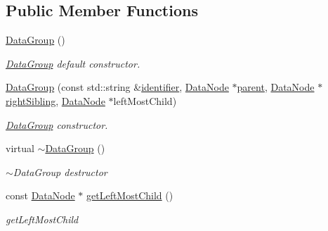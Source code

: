 \subsection*{Public Member Functions}
\begin{DoxyCompactItemize}
\item 
\hyperlink{classDatabase_1_1DataGroup_a633bd46aaee7adafcb0181b12c2466f0}{Data\+Group} ()\hypertarget{classDatabase_1_1DataGroup_a633bd46aaee7adafcb0181b12c2466f0}{}\label{classDatabase_1_1DataGroup_a633bd46aaee7adafcb0181b12c2466f0}

\begin{DoxyCompactList}\small\item\em \hyperlink{classDatabase_1_1DataGroup}{Data\+Group} default constructor. \end{DoxyCompactList}\item 
\hyperlink{classDatabase_1_1DataGroup_a1bed40d80c81f52145c4696b7c70d75b}{Data\+Group} (const std\+::string \&\hyperlink{classDatabase_1_1DataNode_ace59a7fba9c490d2dae59c4af7b0c71f}{identifier}, \hyperlink{classDatabase_1_1DataNode}{Data\+Node} $\ast$\hyperlink{classDatabase_1_1DataNode_a8d70472d0f14aa3ae3ee74d9f3e879d6}{parent}, \hyperlink{classDatabase_1_1DataNode}{Data\+Node} $\ast$\hyperlink{classDatabase_1_1DataNode_ae335fc33c3813e8a6638d50faef44d5d}{right\+Sibling}, \hyperlink{classDatabase_1_1DataNode}{Data\+Node} $\ast$left\+Most\+Child)
\begin{DoxyCompactList}\small\item\em \hyperlink{classDatabase_1_1DataGroup}{Data\+Group} constructor. \end{DoxyCompactList}\item 
virtual \hyperlink{classDatabase_1_1DataGroup_a88b36fe397284004ce86726e7808466e}{$\sim$\+Data\+Group} ()\hypertarget{classDatabase_1_1DataGroup_a88b36fe397284004ce86726e7808466e}{}\label{classDatabase_1_1DataGroup_a88b36fe397284004ce86726e7808466e}

\begin{DoxyCompactList}\small\item\em $\sim$\+Data\+Group destructor \end{DoxyCompactList}\item 
const \hyperlink{classDatabase_1_1DataNode}{Data\+Node} $\ast$ \hyperlink{classDatabase_1_1DataGroup_af6abab9878250ade850fc8e43042ab01}{get\+Left\+Most\+Child} ()
\begin{DoxyCompactList}\small\item\em get\+Left\+Most\+Child \end{DoxyCompactList}\end{DoxyCompactItemize}
